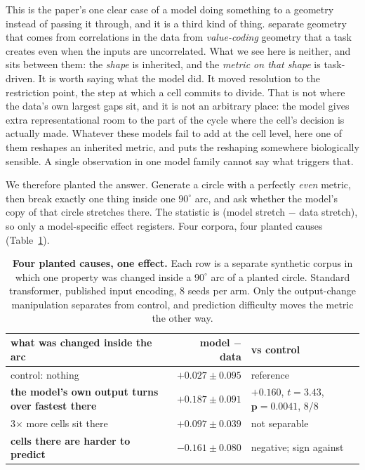 \documentclass[11pt]{article}
\begin{document}
This is the paper's one clear case of a model doing something to a geometry instead of passing it
through, and it is a third kind of thing. \citet{prieto2026correlations} separate geometry that comes
from correlations in the data from \emph{value-coding} geometry that a task creates even when the
inputs are uncorrelated. What we see here is neither, and sits between them: the \emph{shape} is
inherited, and the \emph{metric on that shape} is task-driven. It is worth saying what the model did. It moved resolution to the restriction point, the
step at which a cell commits to divide. That is not where the data's own largest gaps sit, and it is
not an arbitrary place: the model gives extra representational room to the part of the cycle where the
cell's decision is actually made. Whatever these models fail to add at the cell level, here one of them
reshapes an inherited metric, and puts the reshaping somewhere biologically sensible. A single
observation in one model family cannot say what triggers that.

We therefore planted the answer. Generate a circle with a perfectly \emph{even} metric, then break
exactly one thing inside one $90^\circ$ arc, and ask whether the model's copy of that circle stretches
there. The statistic is (model stretch $-$ data stretch), so only a model-specific effect registers. Four
corpora, four planted causes (Table~\ref{tab:warp}).

\begin{table}[h]\centering\small
\caption{\textbf{Four planted causes, one effect.} Each row is a separate synthetic corpus
in which one property was changed inside a $90^\circ$ arc of a planted circle. Standard transformer,
published input encoding, 8 seeds per arm. Only the output-change manipulation separates from control,
and prediction difficulty moves the metric the other way.}
\label{tab:warp}
\begin{tabular}{lrl}
\toprule
what was changed inside the arc & model $-$ data & vs control \\
\midrule
control: nothing & $+0.027 \pm 0.095$ & reference \\
\textbf{the model's own output turns over fastest there} & $\mathbf{+0.187 \pm 0.091}$ &
  $\mathbf{+0.160}$, $t=3.43$, $\mathbf{p=0.0041}$, 8/8 \\
3$\times$ more cells sit there & $+0.097 \pm 0.039$ & not separable \\
\textbf{cells there are harder to predict} & $\mathbf{-0.161 \pm 0.080}$ & negative; sign against \\
\bottomrule
\end{tabular}
\end{table}
\end{document}
